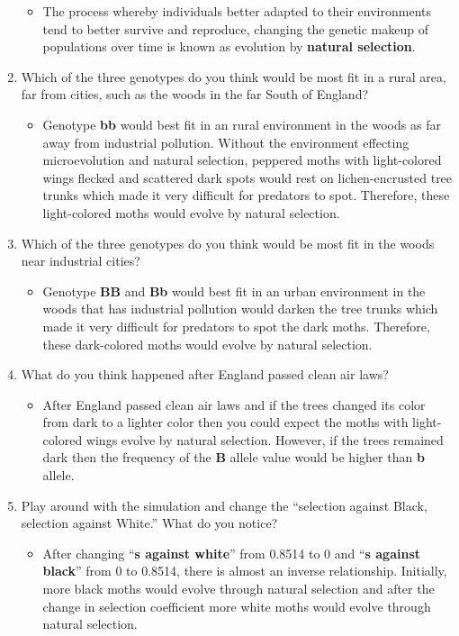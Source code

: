 \documentclass{article}
\begin{document}
\begin{enumerate}
\begin{itemize}
    \item The process whereby individuals better adapted to their environments tend to better survive and reproduce, changing the genetic makeup of populations over time is known as evolution by \textbf{natural selection}.
  \end{itemize}
  \item Which of the three genotypes do you think would be most fit in a rural area, far from cities, such as the woods in the far South of England?
  \begin{itemize}
    \item Genotype \textbf{bb} would best fit in an rural environment in the woods as far away from industrial pollution. Without the environment effecting microevolution and natural selection, peppered moths with light-colored wings flecked and scattered dark spots would rest on lichen-encrusted tree trunks which made it very difficult for predators to spot. Therefore, these light-colored moths would evolve by natural selection.
  \end{itemize}
  \item Which of the three genotypes do you think would be most fit in the woods near industrial cities?
  \begin{itemize}
    \item Genotype \textbf{BB} and \textbf{Bb} would best fit in an urban environment in the woods that has industrial pollution would darken the tree trunks which made it very difficult for predators to spot the dark moths. Therefore, these dark-colored moths would evolve by natural selection.
  \end{itemize}
  \item What do you think happened after England passed clean air laws?
  \begin{itemize}
    \item After England passed clean air laws and if the trees changed its color from dark to a lighter color then you could expect the moths with light-colored wings evolve by natural selection. However, if the trees remained dark then the frequency of the \textbf{B} allele value would be higher than \textbf{b} allele.
  \end{itemize}
  \item Play around with the simulation and change the ``selection against Black, selection against White.'' What do you notice?
  \begin{itemize}
    \item After changing ``\textbf{s against white}'' from 0.8514 to 0 and ``\textbf{s against black}'' from 0 to 0.8514, there is almost an inverse relationship. Initially, more black moths would evolve through natural selection and after the change in selection coefficient more white moths would evolve through natural selection.
  \end{itemize}
\end{enumerate}
\end{document}
